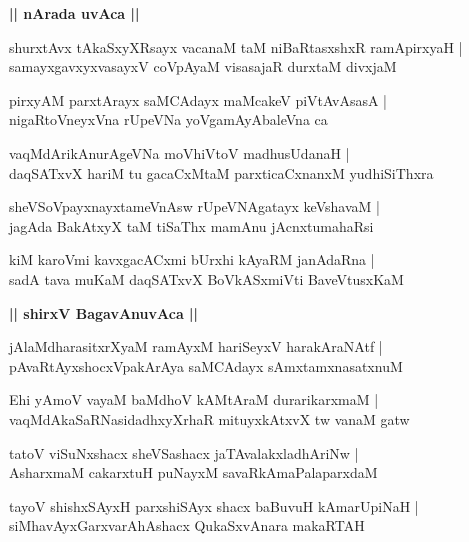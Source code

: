 \documentclass[twoside,12pt,openright]{book}
\newcounter{shloka}[chapter]
\def\uvaca#1{\centerline{{\large\textbf{#1}}}}
\begin{document}
\uvaca{|| nArada uvAca ||}

\begin{shloka}%
shurxtAvx  tAkaSxyXRsayx vacanaM taM niBaRtasxshxR ramApirxyaH |\\
samayxgavxyxvasayxV coVpAyaM visasajaR durxtaM divxjaM 
\end{shloka}

\begin{shloka}%
pirxyAM parxtArayx saMCAdayx maMcakeV piVtAvAsasA |\\
nigaRtoVneyxVna rUpeVNa yoVgamAyAbaleVna ca 
\end{shloka}

\begin{shloka}%
vaqMdArikAnurAgeVNa moVhiVtoV madhusUdanaH |\\
daqSATxvX hariM tu gacaCxMtaM parxticaCxnanxM yudhiSiThxra 
\end{shloka}

\begin{shloka}%
sheVSoVpayxnayxtameVnAsw rUpeVNAgatayx keVshavaM |\\
jagAda BakAtxyX taM tiSaThx mamAnu jAcnxtumahaRsi 
\end{shloka}

\begin{shloka}%
kiM karoVmi kavxgacACxmi bUrxhi kAyaRM janAdaRna |\\
sadA tava muKaM daqSATxvX BoVkASxmiVti BaveVtusxKaM 
\end{shloka}

\uvaca{|| shirxV BagavAnuvAca ||}

\begin{shloka}%
jAlaMdharasitxrXyaM ramAyxM hariSeyxV harakAraNAtf |\\
pAvaRtAyxshocxVpakArAya saMCAdayx sAmxtamxnasatxnuM 
\end{shloka}

\begin{shloka}%
Ehi yAmoV vayaM baMdhoV kAMtAraM durarikarxmaM |\\
vaqMdAkaSaRNasidadhxyXrhaR mituyxkAtxvX tw vanaM gatw 
\end{shloka}

\begin{shloka}%
tatoV viSuNxshacx sheVSashacx jaTAvalakxladhAriNw |\\
AsharxmaM cakarxtuH puNayxM savaRkAmaPalaparxdaM 
\end{shloka}

\begin{shloka}%
tayoV shishxSAyxH parxshiSAyx shacx baBuvuH kAmarUpiNaH |\\
siMhavAyxGarxvarAhAshacx QukaSxvAnara makaRTAH 
\end{shloka}
\end{document}
